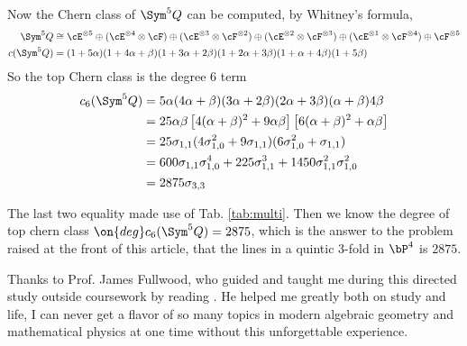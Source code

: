 \documentclass[a4paper, twoside]{article}
\begin{document}
Now the Chern class of $\Sym^5Q$ can be computed, by Whitney's formula,
\begin{equation*}
	\begin{split}
		\Sym^5Q&\cong\cE^{\otimes 5}\oplus (\cE^{\otimes 4}\otimes \cF)\oplus (\cE^{\otimes 3}\otimes \cF^{\otimes 2})\oplus (\cE^{\otimes 2}\otimes \cF^{\otimes 3})\oplus (\cE^{\otimes 1}\otimes \cF^{\otimes 4})\oplus \cF^{\otimes 5}\\
		c(\Sym^5Q)&=(1+5\alpha)(1+4\alpha+\beta)(1+3\alpha+2\beta)(1+2\alpha+3\beta)(1+\alpha+4\beta)(1+5\beta)\\
	\end{split}
\end{equation*}
So the top Chern class is the degree $6$ term
\begin{equation*}
	\begin{split}
	c_6(\Sym^5Q)&=5\alpha(4\alpha+\beta)(3\alpha+2\beta)(2\alpha+3\beta)(\alpha+\beta)4\beta\\
	&=25\alpha\beta \left[4(\alpha+\beta)^2 + 9\alpha\beta\right]\left[6(\alpha+\beta)^2 + \alpha\beta\right]\\
	&=25\sigma_{1,1}(4\sigma_{1,0}^2+9\sigma_{1,1})(6\sigma_{1,0}^2+\sigma_{1,1})\\
	&=600\sigma_{1,1}\sigma_{1,0}^4+225\sigma_{1,1}^3+1450\sigma_{1,1}^2\sigma_{1,0}^2\\
	&=2875\sigma_{3,3}
	\end{split}
\end{equation*}

The last two equality made use of Tab. \ref{tab:multi}. Then we know the degree of top chern class $\on{deg}c_6(\Sym^5Q)=2875$, which is the answer to the problem raised at the front of this article, that the lines in a quintic 3-fold in $\bP^4$ is $2875$.

%
Thanks to Prof. James Fullwood, who guided and taught me during this directed study outside coursework by reading \cite{Katz2006}. He helped me greatly both on study and life, I can never get a flavor of so many topics in modern algebraic geometry and mathematical physics at one time without this unforgettable experience.




\end{document}
